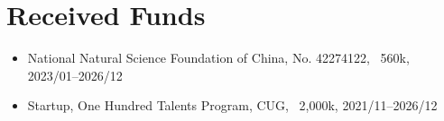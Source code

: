 \section{Received Funds}

\begin{itemize}
\item National Natural Science Foundation of China, No. 42274122, \textyen\ 560k, 2023/01--2026/12
\item Startup, One Hundred Talents Program, CUG, \textyen\ 2,000k, 2021/11--2026/12
\end{itemize}
